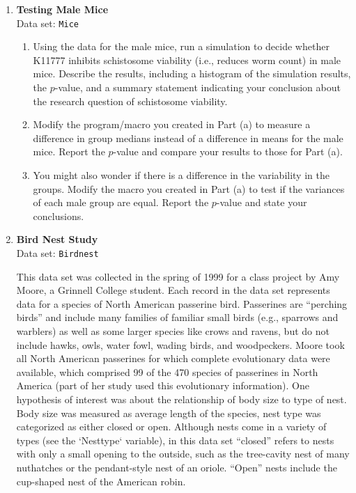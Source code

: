 \documentclass[
]{report}
\begin{document}
\begin{enumerate}
    
  \item \textbf{Testing Male Mice} \\
  Data set: \texttt{Mice} 
  \begin{enumerate}
    \item Using the data for the male mice, run a simulation to decide whether K11777 inhibits schistosome
viability (i.e., reduces worm count) in male mice. Describe the results, including a histogram
of the simulation results, the $\scriptstyle p$-value, and a summary statement indicating your conclusion
about the research question of schistosome viability.
    \item Modify the program/macro you created in Part (a) to measure a difference in group medians
instead of a difference in means for the male mice. Report the $\scriptstyle p$-value and compare your results
to those for Part (a).
    \item You might also wonder if there is a difference in the variability in the groups. Modify the macro
you created in Part (a) to test if the variances of each male group are equal. Report the $\scriptstyle p$-value and
state your conclusions.
  \end{enumerate}
  
  
  
  \item \textbf{Bird Nest Study} \\
  Data set: \texttt{Birdnest}
  
  This data set was collected in the spring of 1999 for a class project by Amy Moore, a Grinnell College student. Each record in the data set represents data for a species of North American passerine bird. Passerines are “perching birds” and include many families of familiar small birds (e.g., sparrows and warblers) as well as some larger species like crows and ravens, but do not include hawks, owls, water fowl, wading birds, and woodpeckers. Moore took all North American passerines for which complete evolutionary data were available, which comprised 99 of the 470 species of passerines in North America (part of her study used this evolutionary information). One hypothesis of interest was about the relationship of body size to type of nest. Body size was measured as average length of the species, nest type was categorized as either closed or open. Although nests come in a variety of types (see the `Nesttype` variable), in this data set “closed” refers to nests with only a small opening to the outside, such as the tree-cavity nest of many nuthatches or the pendant-style
nest of an oriole. “Open” nests include the cup-shaped nest of the American robin.
  \begin{enumerate}
      

\end{enumerate}
\end{enumerate}
\end{document}
